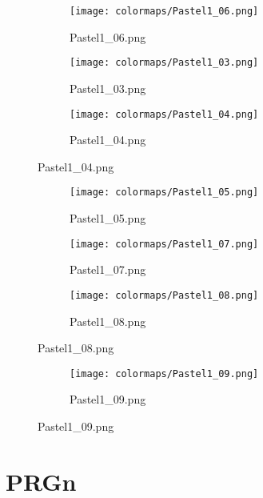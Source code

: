 \documentclass{article}%
\begin{document}
\begin{figure}[h!]%
\begin{subfigure}[b]{0.3\linewidth}%
\texttt{[image: colormaps/Pastel1\_06.png]}%
\caption{Pastel1\_06.png}%
\end{subfigure}%
\begin{subfigure}[b]{0.3\linewidth}%
\texttt{[image: colormaps/Pastel1\_03.png]}%
\caption{Pastel1\_03.png}%
\end{subfigure}%
\begin{subfigure}[b]{0.3\linewidth}%
\texttt{[image: colormaps/Pastel1\_04.png]}%
\caption{Pastel1\_04.png}%
\end{subfigure}%
\end{figure}

%
\hspace{1cm}\hfill%
\hspace{1cm}\hfill%
\hspace{1cm}\hfill%


\begin{figure}[h!]%
\begin{subfigure}[b]{0.3\linewidth}%
\texttt{[image: colormaps/Pastel1\_05.png]}%
\caption{Pastel1\_05.png}%
\end{subfigure}%
\begin{subfigure}[b]{0.3\linewidth}%
\texttt{[image: colormaps/Pastel1\_07.png]}%
\caption{Pastel1\_07.png}%
\end{subfigure}%
\begin{subfigure}[b]{0.3\linewidth}%
\texttt{[image: colormaps/Pastel1\_08.png]}%
\caption{Pastel1\_08.png}%
\end{subfigure}%
\end{figure}

%
\hspace{1cm}\hfill%


\begin{figure}[h!]%
\begin{subfigure}[b]{0.3\linewidth}%
\texttt{[image: colormaps/Pastel1\_09.png]}%
\caption{Pastel1\_09.png}%
\end{subfigure}%
\end{figure}

%
\newpage%
\section{PRGn}%
\label{sec:PRGn}%
\hspace{1cm}\hfill%
\hspace{1cm}\hfill%
\hspace{1cm}\hfill%
\end{document}
